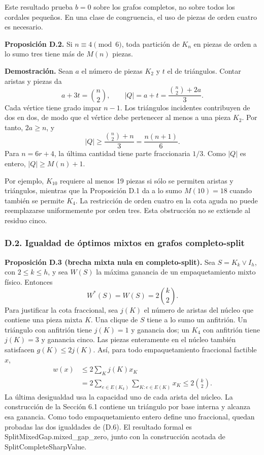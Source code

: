 \documentclass[spanish,11pt,a4paper]{article}
\begin{document}
Este resultado prueba \(b=0\) sobre los grafos completos, no sobre todos los cordales pequeños. En una clase de congruencia, el uso de piezas de orden cuatro es necesario.

\textbf{Proposición D.2.} Si \(n\equiv4\pmod6\), toda partición de \(K_n\) en piezas de orden a lo sumo tres tiene más de \(M(n)\) piezas.

\textbf{Demostración.} Sean \(a\) el número de piezas \(K_2\) y \(t\) el de triángulos. Contar aristas y piezas da \[
a+3t=\binom n2,\qquad |Q|=a+t=\frac{\binom n2+2a}{3}.
\tag{D.5}
\] Cada vértice tiene grado impar \(n-1\). Los triángulos incidentes contribuyen de dos en dos, de modo que el vértice debe pertenecer al menos a una pieza \(K_2\). Por tanto, \(2a\ge n\), y \[
|Q|\ge\frac{\binom n2+n}{3}=\frac{n(n+1)}6.
\] Para \(n=6r+4\), la última cantidad tiene parte fraccionaria \(1/3\). Como \(|Q|\) es entero, \(|Q|\ge M(n)+1\).

Por ejemplo, \(K_{10}\) requiere al menos 19 piezas si sólo se permiten aristas y triángulos, mientras que la Proposición D.1 da a lo sumo \(M(10)=18\) cuando también se permite \(K_4\). La restricción de orden cuatro en la cota aguda no puede reemplazarse uniformemente por orden tres. Esta obstrucción no se extiende al residuo cinco.


\subsubsection{D.2. Igualdad de óptimos mixtos en grafos completo-split}\label{d.2.-igualdad-de-optimos-mixtos-en-grafos-completo-split}

\textbf{Proposición D.3 (brecha mixta nula en completo-split).} Sea \(S=K_k\vee I_h\), con \(2\le k\le h\), y sea \(W(S)\) la máxima ganancia de un empaquetamiento mixto físico. Entonces \[
W^*(S)=W(S)=2\binom k2.
\tag{D.6}
\] Para justificar la cota fraccional, sea \(j(K)\) el número de aristas del núcleo que contiene una pieza mixta \(K\). Una clique de \(S\) tiene a lo sumo un anfitrión. Un triángulo con anfitrión tiene \(j(K)=1\) y ganancia dos; un \(K_4\) con anfitrión tiene \(j(K)=3\) y ganancia cinco. Las piezas enteramente en el núcleo también satisfacen \(g(K)\le2j(K)\). Así, para todo empaquetamiento fraccional factible \(x\), \[
\begin{aligned}
w(x)&\le2\sum_K j(K)x_K\\
&=2\sum_{e\in E(K_k)}\sum_{K:e\in E(K)}x_K
\le2\binom k2.
\end{aligned}
\tag{D.7}
\] La última desigualdad usa la capacidad uno de cada arista del núcleo. La construcción de la Sección 6.1 contiene un triángulo por base interna y alcanza esa ganancia. Como todo empaquetamiento entero define uno fraccional, quedan probadas las dos igualdades de (D.6). El resultado formal es {\ttfamily\small SplitMixedGa\discretionary{\hbox{\ensuremath{\hookrightarrow}}}{}{}p.\discretionary{\hbox{\ensuremath{\hookrightarrow}}}{}{}mixed\_\discretionary{\hbox{\ensuremath{\hookrightarrow}}}{}{}gap\_\discretionary{\hbox{\ensuremath{\hookrightarrow}}}{}{}zero}, junto con la construcción acotada de {\ttfamily\small SplitComplet\discretionary{\hbox{\ensuremath{\hookrightarrow}}}{}{}eSharpValue}.
\end{document}
